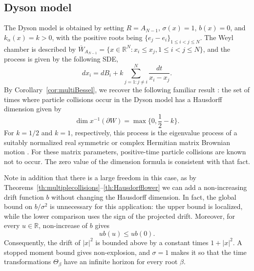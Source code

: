 \documentclass{article}
\numberwithin{equation}{section}
\newcommand{\R}{\mathbb{R}}
\theoremstyle{plain}
\begin{document}
    \subsection{Dyson model}
    The Dyson model \cite{Dyson62A} is obtained by setting $R=A_{N-1}$, $\sigma(x)=1$, $b(x)=0$, and $k_\alpha(x)=k>0$, with the positive roots being $\{e_j- e_i\}_{1\leq i<j\leq N}$. The Weyl chamber is described by $ \overline W_{A_{N-1}}=\{x\in\R^N:x_i\leq x_j, 1\leq i<j\leq N\}$, and the process is given by the following SDE,
        \[dx_i=dB_i+k\sum_{j=1:j\neq i}^N\frac{dt}{x_i-x_j}.\]
        By Corollary~\ref{cor:multiBessel}, we recover the following familiar result \cite{HufnagelAndraus24}: the set of times where particle collisions occur in the Dyson model has a Hausdorff dimension given by
        \[\dim x^{-1}(\partial W)=\max\Big\{0,\frac12-k\Big\}.\]
    For $k=1/2$ and $k=1$, respectively, this process is the eigenvalue process of a suitably normalized real symmetric or complex Hermitian matrix Brownian motion \cite{KatoriTanemura04}. For these matrix parameters, positive-time particle collisions are known not to occur. The zero value of the dimension formula is consistent with that fact.

    Note in addition that there is a large freedom in this case, as by Theorems~\ref{th:multiplecollisions}--\ref{th:Hausdorfflower} we can add a non-increasing drift function $b$ without changing the Hausdorff dimension. In fact, the global bound on $b/\sigma^2$ is unnecessary for this application: the upper bound is localized, while the lower comparison uses the sign of the projected drift. Moreover, for every $u\in\R$, non-increase of $b$ gives
    \[
         u b(u)\leq u b(0).
    \]
    Consequently, the drift of $|x|^2$ is bounded above by a constant times $1+|x|^2$. A stopped moment bound gives non-explosion, and $\sigma=1$ makes it so that the time transformations $\Theta_\beta$ have an infinite horizon for every root $\beta$.
\end{document}
